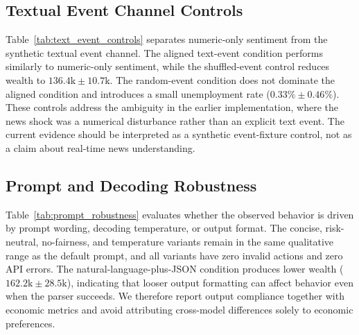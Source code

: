 \subsection{Textual Event Channel Controls}
\label{sec:text_event_controls}

Table~\ref{tab:text_event_controls} separates numeric-only sentiment from the
synthetic textual event channel.  The aligned text-event condition performs
similarly to numeric-only sentiment, while the shuffled-event control reduces
wealth to $136.4\mathrm{k}\pm10.7\mathrm{k}$.  The random-event condition does
not dominate the aligned condition and introduces a small unemployment rate
($0.33\%\pm0.46\%$).  These controls address the ambiguity in the earlier
implementation, where the news shock was a numerical disturbance rather than an
explicit text event.  The current evidence should be interpreted as a synthetic
event-fixture control, not as a claim about real-time news understanding.

\subsection{Prompt and Decoding Robustness}
\label{sec:prompt_robustness}

Table~\ref{tab:prompt_robustness} evaluates whether the observed behavior is
driven by prompt wording, decoding temperature, or output format.  The concise,
risk-neutral, no-fairness, and temperature variants remain in the same
qualitative range as the default prompt, and all variants have zero invalid
actions and zero API errors.  The natural-language-plus-JSON condition produces
lower wealth ($162.2\mathrm{k}\pm28.5\mathrm{k}$), indicating that looser output
formatting can affect behavior even when the parser succeeds.  We therefore
report output compliance together with economic metrics and avoid attributing
cross-model differences solely to economic preferences.
